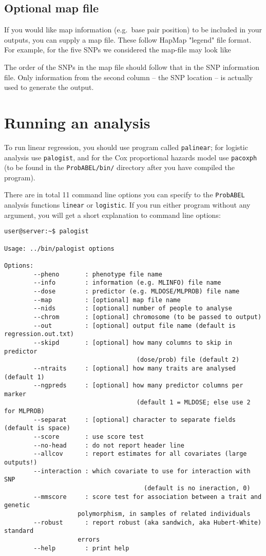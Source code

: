 \documentclass[12pt,a4paper]{article}
\begin{document}
\subsection{Optional map file}
If you would like map information (e.g.~base pair position) to 
be included in your outputs, you can supply a map file. These follow 
HapMap "legend" file format. For example, for the five SNPs we considered 
the map-file may look like



The order of the SNPs in the map file should follow that in the SNP information 
file. Only information from the second column -- the SNP location -- is 
actually used to generate the output.

\section{Running an analysis}
To run linear regression, you should use program called \texttt{palinear};
for logistic analysis use \texttt{palogist}, and for the Cox proportional 
hazards model use \texttt{pacoxph} (to be found in the
\texttt{ProbABEL/bin/} directory after you have compiled the program).

There are in total 11 command line options you can specify to the
\texttt{ProbABEL} analysis functions \texttt{linear} or
\texttt{logistic}. If you run either program without any argument, you
will get a short explanation to command line options:

\begin{verbatim}
user@server:~$ palogist

Usage: ../bin/palogist options

Options:
		--pheno       : phenotype file name
		--info        : information (e.g. MLINFO) file name
		--dose        : predictor (e.g. MLDOSE/MLPROB) file name
		--map         : [optional] map file name
		--nids        : [optional] number of people to analyse
		--chrom       : [optional] chromosome (to be passed to output)
		--out         : [optional] output file name (default is regression.out.txt)
		--skipd       : [optional] how many columns to skip in predictor
								    (dose/prob) file (default 2)
		--ntraits     : [optional] how many traits are analysed (default 1)
		--ngpreds     : [optional] how many predictor columns per marker
								    (default 1 = MLDOSE; else use 2 for MLPROB)
		--separat     : [optional] character to separate fields (default is space)
		--score       : use score test
		--no-head     : do not report header line
		--allcov      : report estimates for all covariates (large outputs!)
		--interaction : which covariate to use for interaction with SNP
									  (default is no ineraction, 0)
		--mmscore     : score test for association between a trait and genetic
                    polymorphism, in samples of related individuals	
		--robust      : report robust (aka sandwich, aka Hubert-White) standard 
                    errors
		--help        : print help

\end{verbatim}
\end{document}
